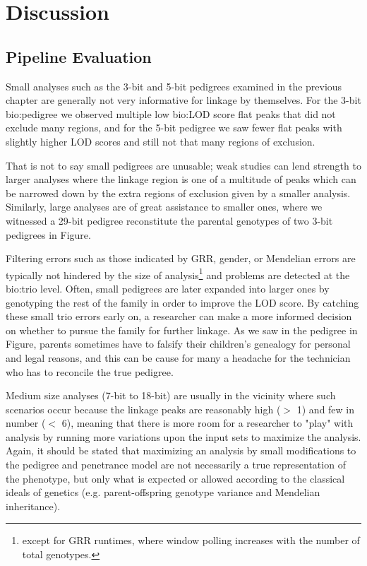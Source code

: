 \chapter{Discussion}

\section{Pipeline Evaluation}

Small analyses such as the 3-bit and 5-bit pedigrees examined in the previous chapter are generally not very informative for linkage by themselves. For the 3-bit \gls{bio:pedigree} we observed multiple low \gls{bio:LOD} score flat peaks that did not exclude many regions, and for the 5-bit pedigree we saw fewer flat peaks with slightly higher LOD scores and still not that many regions of exclusion.

That is not to say small pedigrees are unusable; weak studies can lend strength to larger analyses where the linkage region is one of a multitude of peaks which can be narrowed down by the extra regions of exclusion given by a smaller analysis. Similarly, large analyses are of great assistance to smaller ones, where we witnessed a 29-bit pedigree reconstitute the parental genotypes of two 3-bit pedigrees in Figure.

Filtering errors such as those indicated by GRR, gender, or Mendelian errors are typically not hindered by the size of analysis\footnote{except for GRR runtimes, where window polling increases with the number of total genotypes.} and problems are detected at the \gls{bio:trio} level. Often, small pedigrees are later expanded into larger ones by genotyping the rest of the family in order to improve the LOD score. By catching these small trio errors early on, a researcher can make a more informed decision on whether to pursue the family for further linkage. As we saw in the pedigree in Figure, parents sometimes have to falsify their children's genealogy for personal and legal reasons, and this can be cause for many a headache for the technician who has to reconcile the true pedigree.

Medium size analyses (7-bit to 18-bit) are usually in the vicinity where such scenarios occur because the linkage peaks are reasonably high ($>$ 1) and few in number ($<$ 6), meaning that there is more room for a researcher to "play" with analysis by running more variations upon the input sets to maximize the analysis. Again, it should be stated that maximizing an analysis by small modifications to the pedigree and penetrance model are not necessarily a true representation of the phenotype, but only what is expected or allowed according to the classical ideals of genetics (e.g. parent-offspring genotype variance and Mendelian inheritance).

